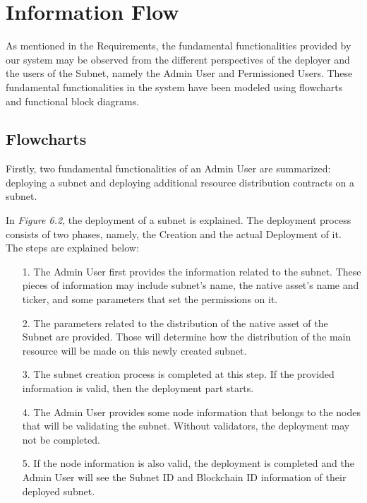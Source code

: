 \documentclass[a4paper,12pt]{report}
\begin{document}
\section{Information Flow}
As mentioned in the Requirements, the fundamental functionalities provided by our system may be observed from the different perspectives of the deployer and the users of the Subnet, namely the Admin User and Permissioned Users. These fundamental functionalities in the system have been modeled using flowcharts and functional block diagrams.

\subsection{Flowcharts}
Firstly, two fundamental functionalities of an Admin User are summarized: deploying a subnet and deploying additional resource distribution contracts on a subnet. 

In \textit{Figure 6.2}, the deployment of a subnet is explained. The deployment process consists of two phases, namely, the Creation and the actual Deployment of it. The steps are explained below:
\begin{itemize}
	\item [1.]
	The Admin User first provides the information related to the subnet. These pieces of information may include subnet’s name, the native asset’s name and ticker, and some parameters that set the permissions on it.
	\\
	\item [2.]
	The parameters related to the distribution of the native asset of the Subnet are provided. Those will determine how the distribution of the main resource will be made on this newly created subnet.
	\\
	\item [3.]
	The subnet creation process is completed at this step. If the provided information is valid, then the deployment part starts.
	\\
	\item [4.]
	The Admin User provides some node information that belongs to the nodes that will be validating the subnet. Without validators, the deployment may not be completed.
	\\
	\item [5.]
	If the node information is also valid, the deployment is completed and the Admin User will see the Subnet ID and Blockchain ID information of their deployed subnet.
\end{itemize}
\end{document}
